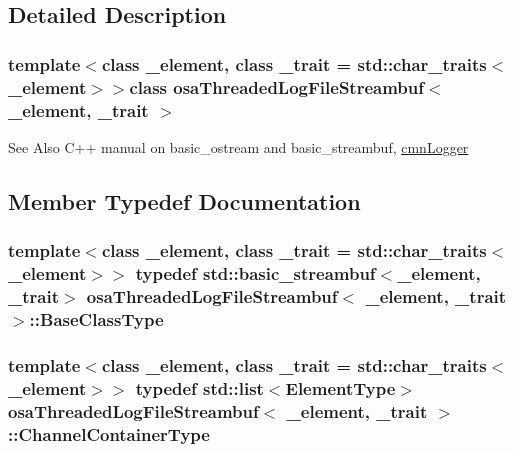 \subsection{Detailed Description}
\subsubsection*{template$<$class \-\_\-element, class \-\_\-trait = std\-::char\-\_\-traits$<$\-\_\-element$>$$>$class osa\-Threaded\-Log\-File\-Streambuf$<$ \-\_\-element, \-\_\-trait $>$}

\begin{DoxySeeAlso}{See Also}
C++ manual on basic\-\_\-ostream and basic\-\_\-streambuf, \hyperlink{classcmn_logger}{cmn\-Logger} 
\end{DoxySeeAlso}


\subsection{Member Typedef Documentation}
\hypertarget{classosa_threaded_log_file_streambuf_a918db063483813434ed1d8f81c3fb205}{
\subsubsection[{Base\-Class\-Type}]{\setlength{\rightskip}{0pt plus 5cm}template$<$class \-\_\-element, class \-\_\-trait = std\-::char\-\_\-traits$<$\-\_\-element$>$$>$ typedef std\-::basic\-\_\-streambuf$<$\-\_\-element, \-\_\-trait$>$ {\bf osa\-Threaded\-Log\-File\-Streambuf}$<$ \-\_\-element, \-\_\-trait $>$\-::{\bf Base\-Class\-Type}}}\label{classosa_threaded_log_file_streambuf_a918db063483813434ed1d8f81c3fb205}
\hypertarget{classosa_threaded_log_file_streambuf_aa02aa00f9d3dbd620e15914d5ee83fb5}{
\subsubsection[{Channel\-Container\-Type}]{\setlength{\rightskip}{0pt plus 5cm}template$<$class \-\_\-element, class \-\_\-trait = std\-::char\-\_\-traits$<$\-\_\-element$>$$>$ typedef std\-::list$<${\bf Element\-Type}$>$ {\bf osa\-Threaded\-Log\-File\-Streambuf}$<$ \-\_\-element, \-\_\-trait $>$\-::{\bf Channel\-Container\-Type}}}\label{classosa_threaded_log_file_streambuf_aa02aa00f9d3dbd620e15914d5ee83fb5}
